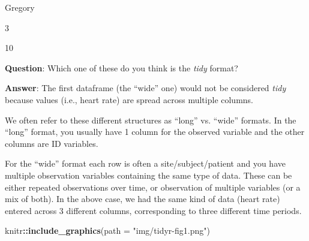 \documentclass[]{book}
\newenvironment{Shaded}{\begin{snugshade}}{\end{snugshade}}
\newcommand{\KeywordTok}[1]{\textcolor[rgb]{0.13,0.29,0.53}{\textbf{#1}}}
\newcommand{\DataTypeTok}[1]{\textcolor[rgb]{0.13,0.29,0.53}{#1}}
\newcommand{\StringTok}[1]{\textcolor[rgb]{0.31,0.60,0.02}{#1}}
\newcommand{\OperatorTok}[1]{\textcolor[rgb]{0.81,0.36,0.00}{\textbf{#1}}}
\newcommand{\NormalTok}[1]{#1}
\begin{document}
Gregory

3

10

\textbf{Question}: Which one of these do you think is the \emph{tidy}
format?

\textbf{Answer}: The first dataframe (the ``wide'' one) would not be
considered \emph{tidy} because values (i.e., heart rate) are spread
across multiple columns.

We often refer to these different structures as ``long'' vs. ``wide''
formats. In the ``long'' format, you usually have 1 column for the
observed variable and the other columns are ID variables.

For the ``wide'' format each row is often a site/subject/patient and you
have multiple observation variables containing the same type of data.
These can be either repeated observations over time, or observation of
multiple variables (or a mix of both). In the above case, we had the
same kind of data (heart rate) entered across 3 different columns,
corresponding to three different time periods.

\begin{Shaded}
\begin{Highlighting}[]
\NormalTok{knitr}\OperatorTok{::}\KeywordTok{include_graphics}\NormalTok{(}\DataTypeTok{path =} \StringTok{"img/tidyr-fig1.png"}\NormalTok{)}
\end{Highlighting}
\end{Shaded}
\end{document}

